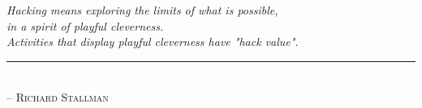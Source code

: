 \chapter*{~}


\begin{center}                      %
\vspace*{2.5in}                     %
\begin{onehalfspacing}
    \textit{
    Hacking means exploring the limits of what is possible, \\ in a spirit of playful cleverness. \\
    Activities that display playful cleverness have "hack value".
    } \\
    
    \rule{1.5in}{0.5pt} \\          %
    
    \textsc{-- Richard Stallman}
\end{onehalfspacing}
\end{center}